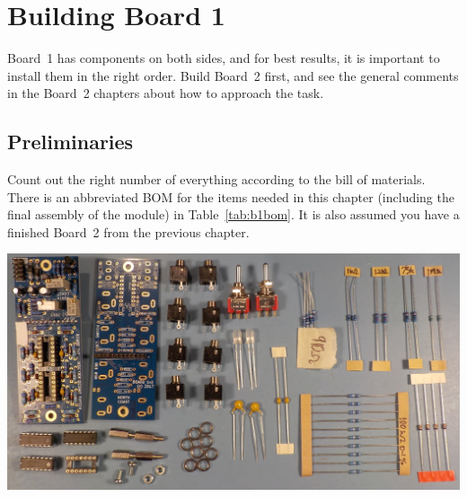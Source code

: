 
%
%
%
%
%
%

\chapter{Building Board 1}\label{ch:board1}

Board~1 has components on both sides, and for best results, it is important
to install them in the right order.  Build Board~2 first, and see the
general comments in the Board~2 chapters about how to approach the task.

\section{Preliminaries}

Count out the right number of everything according to the bill of materials. 
There is an abbreviated BOM for the items needed in this chapter (including
the final assembly of the module) in Table~\ref{tab:b1bom}.  It
is also assumed you have a finished Board~2 from the previous chapter.

\noindent\includegraphics[width=\linewidth]{board1-parts.jpg}

